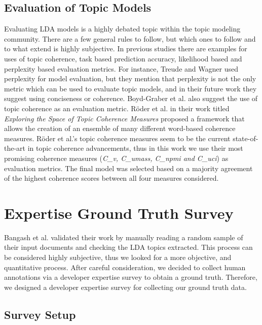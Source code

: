     \subsection{Evaluation of Topic Models} \label{evaluationMetric}
    
        Evaluating LDA models is a highly debated topic within the topic modeling community. There are a few general rules to follow, but which ones to follow and to what extend is highly subjective. In previous studies there are examples for uses of topic coherence, task based prediction accuracy, likelihood based and perplexity based evaluation metrics. For instance, Treude and Wagner \cite{treude2019predicting} used perplexity for model evaluation, but they mention that perplexity is not the only metric which can be used to evaluate topic models, and in their future work they suggest using conciseness or coherence. Boyd-Graber et al. \cite{boyd2014care} also suggest the use of topic coherence as an evaluation metric. R{\"o}der et al. \cite{roder2015exploring} in their work titled \textit{Exploring the Space of Topic Coherence Measures} proposed a framework that allows the creation of an ensemble of many different word-based coherence measures. R{\"o}der et al.'s topic coherence measures seem to be the current state-of-the-art in topic coherence advancements, thus in this work  we use their most promising coherence measures (\emph{C\_v, C\_umass, C\_npmi and C\_uci}) as evaluation metrics. The final model was selected based on a majority agreement of the highest coherence scores between all four measures considered.
    
    \section{Expertise Ground Truth Survey} \label{sec:expertise_survey}
    
        Bangash et al. \cite{bangash2019developers} validated their work by manually reading a random sample of their input documents and checking the LDA topics extracted. This process can be considered highly subjective, thus we looked for a more objective, and quantitative process. After careful consideration, we decided to collect human annotations via a developer expertise survey to obtain a ground truth. Therefore, we designed a developer expertise survey for collecting our ground truth data. 
    
        \subsection{Survey Setup}
        
